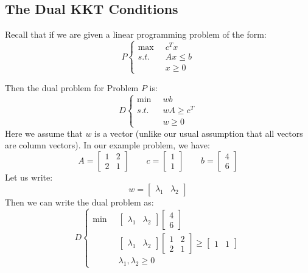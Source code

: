 \subsection{The Dual KKT Conditions}
Recall that if we are given a linear programming problem of the form:
\begin{equation}
P\left\{
\begin{aligned}
\max\;\; & {c}^T{x}\\
s.t.\;\; & {A}{x} \leq {b}\\
& {x} \geq 0
\end{aligned}\right.
\end{equation}

Then the dual problem for Problem $P$ is:
\begin{equation}
D\left\{
\begin{aligned}
\min\;\; & {w}{b}\\
s.t.\;\; & {w}{A} \geq {c}^T\\
& {w} \geq {0}
\end{aligned}\right.
\end{equation}
Here we assume that ${w}$ is a  vector (unlike our usual assumption that all vectors are column vectors). In our example problem, we have:
\begin{displaymath}
{A} = \begin{bmatrix}1 & 2\\2 & 1\end{bmatrix} \quad \quad {c} = \begin{bmatrix}1\\1\end{bmatrix} \quad \quad {b} = \begin{bmatrix}4\\6\end{bmatrix}
\end{displaymath}
Let us write:
\begin{displaymath}
{w} = \begin{bmatrix} \lambda_1 & \lambda_2 \end{bmatrix}
\end{displaymath}
Then we can write the dual problem as:
\begin{displaymath}
D\left\{
\begin{aligned}
\min \;\; & \begin{bmatrix} \lambda_1 & \lambda_2 \end{bmatrix} \begin{bmatrix}4\\6\end{bmatrix} \\
& \begin{bmatrix} \lambda_1 & \lambda_2 \end{bmatrix} \begin{bmatrix}1 & 2\\2 & 1\end{bmatrix} \geq \begin{bmatrix}1 & 1\end{bmatrix}\\
& \lambda_1, \lambda_2 \geq 0
\end{aligned}
\right.
\end{displaymath}
